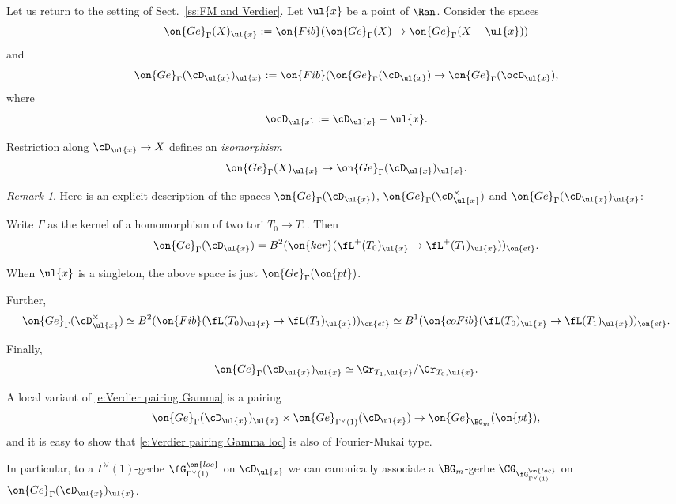 \documentclass[9pt]{amsart}
\theoremstyle{remark}
\newtheorem{rem}[subsubsection]{Remark}
\theoremstyle{definition}
\theoremstyle{remark}
\newcommand{\secref}[1]{Sect.~\ref{#1}}
\numberwithin{equation}{section}
\begin{document}
\sssec{}

Let us return to the setting of \secref{ss:FM and Verdier}. Let $\ul{x}$ be a point of $\Ran$. Consider the spaces
$$\on{Ge}_\Gamma(X)_{\ul{x}}:=\on{Fib}(\on{Ge}_\Gamma(X)\to \on{Ge}_\Gamma(X-\ul{x}))$$
and 
$$\on{Ge}_\Gamma(\cD_{\ul{x}})_{\ul{x}}:=
\on{Fib}(\on{Ge}_\Gamma(\cD_{\ul{x}})\to \on{Ge}_\Gamma(\ocD_{\ul{x}}),$$
where 
$$\ocD_{\ul{x}}:=\cD_{\ul{x}}-\ul{x}.$$

\medskip

Restriction along $\cD_{\ul{x}}\to X$ defines an \emph{isomorphism} 
$$\on{Ge}_\Gamma(X)_{\ul{x}} \to \on{Ge}_\Gamma(\cD_{\ul{x}})_{\ul{x}}.$$

\begin{rem}
Here is an explicit description of the spaces 
$\on{Ge}_\Gamma(\cD_{\ul{x}})$,  $\on{Ge}_\Gamma(\cD^\times_{\ul{x}})$ and 
$\on{Ge}_\Gamma(\cD_{\ul{x}})_{\ul{x}}$:

\medskip

Write $\Gamma$ as the kernel of a homomorphism of two tori $T_0\to T_1$. Then
$$\on{Ge}_\Gamma(\cD_{\ul{x}})=B^2(\on{ker}(\fL^+(T_0)_{\ul{x}}\to \fL^+(T_1)_{\ul{x}}))_{\on{et}}.$$

When $\ul{x}$ is a singleton, the above space is just $\on{Ge}_\Gamma(\on{pt})$. 

\medskip

Further,
$$\on{Ge}_\Gamma(\cD^\times_{\ul{x}})\simeq B^2(\on{Fib}(\fL(T_0)_{\ul{x}}\to \fL(T_1)_{\ul{x}}))_{\on{et}}\simeq 
B^1(\on{coFib}(\fL(T_0)_{\ul{x}}\to \fL(T_1)_{\ul{x}}))_{\on{et}}.$$

Finally, 
$$\on{Ge}_\Gamma(\cD_{\ul{x}})_{\ul{x}}\simeq \Gr_{T_1,\ul{x}}/\Gr_{T_0,\ul{x}}.$$

\end{rem} 

\sssec{} \label{sss:local Verdier}

A local variant of \eqref{e:Verdier pairing Gamma} is a pairing
\begin{equation} \label{e:Verdier pairing Gamma loc}
\on{Ge}_\Gamma(\cD_{\ul{x}})_{\ul{x}} \times \on{Ge}_{\Gamma^\vee(1)}(\cD_{\ul{x}})\to \on{Ge}_{\BG_m}(\on{pt}),
\end{equation}
and it is easy to show that \eqref{e:Verdier pairing Gamma loc} is also of Fourier-Mukai type. 

\medskip

In particular, to a $\Gamma^\vee(1)$-gerbe $\fG^{\on{loc}}_{\Gamma^\vee(1)}$ on $\cD_{\ul{x}}$ we can canonically 
associate a $\BG_m$-gerbe $\CG_{\fG^{\on{loc}}_{\Gamma^\vee(1)}}$ on $\on{Ge}_\Gamma(\cD_{\ul{x}})_{\ul{x}}$.
\end{document}
